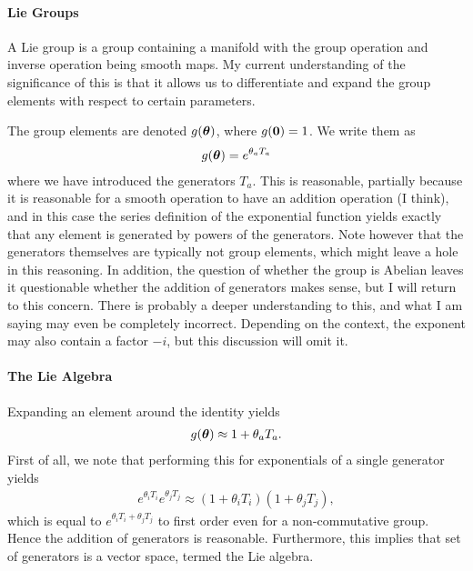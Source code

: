 \paragraph{Lie Groups}
A Lie group is a group containing a manifold with the group operation and inverse operation being smooth maps. My current understanding of the significance of this is that it allows us to differentiate and expand the group elements with respect to certain parameters.

The group elements are denoted $g(\vb*{\theta})$, where $g(\vb{0}) = 1$. We write them as
\begin{align*}
	g(\vb*{\theta}) = e^{\theta_{a}T_{a}}
\end{align*}
where we have introduced the generators $T_{a}$. This is reasonable, partially because it is reasonable for a smooth operation to have an addition operation (I think), and in this case the series definition of the exponential function yields exactly that any element is generated by powers of the generators. Note however that the generators themselves are typically not group elements, which might leave a hole in this reasoning. In addition, the question of whether the group is Abelian leaves it questionable whether the addition of generators makes sense, but I will return to this concern. There is probably a deeper understanding to this, and what I am saying may even be completely incorrect. Depending on the context, the exponent may also contain a factor $-i$, but this discussion will omit it.

\paragraph{The Lie Algebra}
Expanding an element around the identity yields
\begin{align*}
	g(\vb*{\theta}) \approx 1 + \theta_{a}T_{a}.
\end{align*}
First of all, we note that performing this for exponentials of a single generator yields
\begin{align*}
	e^{\theta_{i}T_{i}}e^{\theta_{j}T_{j}} \approx (1 + \theta_{i}T_{i})(1 + \theta_{j}T_{j}),
\end{align*}
which is equal to $e^{\theta_{i}T_{i} + \theta_{j}T_{j}}$ to first order even for a non-commutative group. Hence the addition of generators is reasonable. Furthermore, this implies that set of generators is a vector space, termed the Lie algebra.

